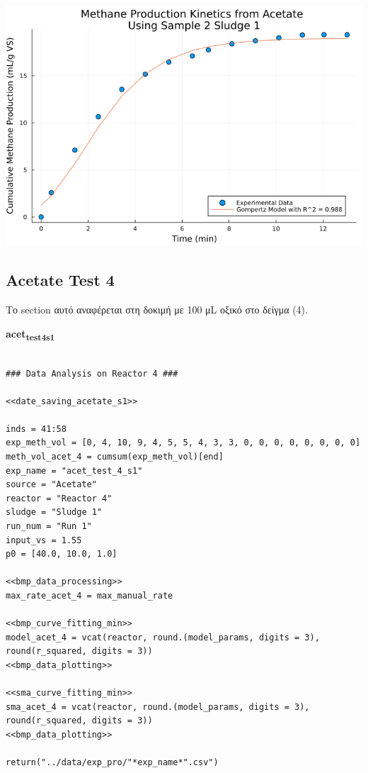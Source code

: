 \documentclass[11pt]{article}
\begin{document}
\begin{center}
\includegraphics[width=.9\linewidth]{../plots/BMPs/Acetate/specific_methane_kinetics_acet_test_2_s1.png}
\end{center}

\subsection{Acetate Test 4}
\label{sec:orgeadd64e}
Το section αυτό αναφέρεται στη δοκιμή με 100 μL οξικό στο δείγμα (4).

\textbf{acet\textsubscript{test}\textsubscript{4}\textsubscript{s1}}
\begin{verbatim}

### Data Analysis on Reactor 4 ###

<<date_saving_acetate_s1>>

inds = 41:58
exp_meth_vol = [0, 4, 10, 9, 4, 5, 5, 4, 3, 3, 0, 0, 0, 0, 0, 0, 0, 0]
meth_vol_acet_4 = cumsum(exp_meth_vol)[end]
exp_name = "acet_test_4_s1"
source = "Acetate"
reactor = "Reactor 4"
sludge = "Sludge 1"
run_num = "Run 1"
input_vs = 1.55
p0 = [40.0, 10.0, 1.0]

<<bmp_data_processing>>
max_rate_acet_4 = max_manual_rate

<<bmp_curve_fitting_min>>
model_acet_4 = vcat(reactor, round.(model_params, digits = 3), round(r_squared, digits = 3))
<<bmp_data_plotting>>

<<sma_curve_fitting_min>>
sma_acet_4 = vcat(reactor, round.(model_params, digits = 3), round(r_squared, digits = 3))
<<bmp_data_plotting>>

return("../data/exp_pro/"*exp_name*".csv")
\end{verbatim}
\end{document}
